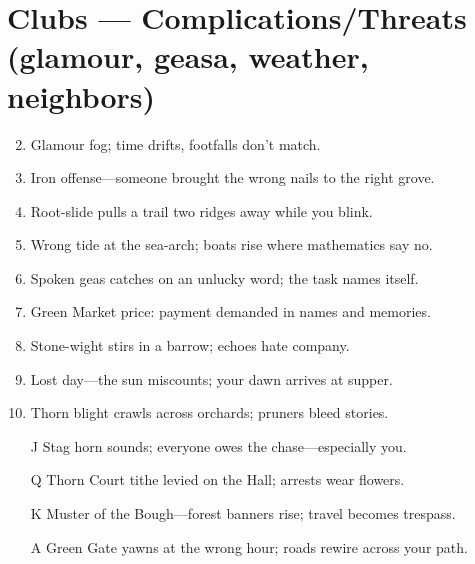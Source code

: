 \section*{Clubs --- Complications/Threats (glamour, geasa, weather, neighbors)}
\label{sec:aelinnel-complications}
\begin{enumerate}
\setcounter{enumi}{1}
\item Glamour fog; time drifts, footfalls don't match.
\item Iron offense---someone brought the wrong nails to the right grove.
\item Root-slide pulls a trail two ridges away while you blink.
\item Wrong tide at the sea-arch; boats rise where mathematics say no.
\item Spoken geas catches on an unlucky word; the task names itself.
\item Green Market price: payment demanded in names and memories.
\item Stone-wight stirs in a barrow; echoes hate company.
\item Lost day---the sun miscounts; your dawn arrives at supper.
\item Thorn blight crawls across orchards; pruners bleed stories.
\item[J] Stag horn sounds; everyone owes the chase---especially you.
\item[Q] Thorn Court tithe levied on the Hall; arrests wear flowers.
\item[K] Muster of the Bough---forest banners rise; travel becomes trespass.
\item[A] Green Gate yawns at the wrong hour; roads rewire across your path.
\end{enumerate}

